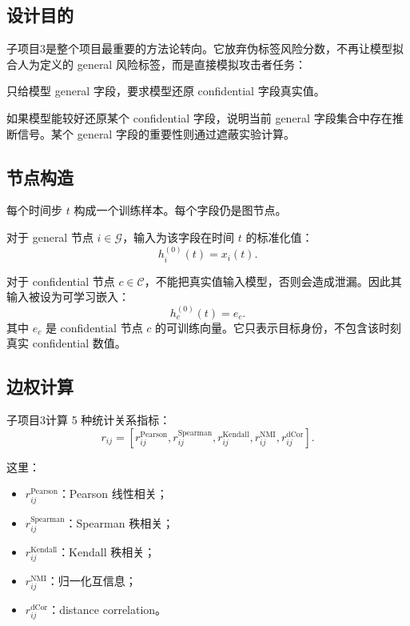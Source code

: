 \documentclass[UTF8]{ctexart}
\begin{document}
\subsection{设计目的}

子项目3是整个项目最重要的方法论转向。它放弃伪标签风险分数，不再让模型拟合人为定义的 general 风险标签，而是直接模拟攻击者任务：

\begin{center}
只给模型 general 字段，要求模型还原 confidential 字段真实值。
\end{center}

如果模型能较好还原某个 confidential 字段，说明当前 general 字段集合中存在推断信号。某个 general 字段的重要性则通过遮蔽实验计算。

\subsection{节点构造}

每个时间步 \(t\) 构成一个训练样本。每个字段仍是图节点。

对于 general 节点 \(i\in\mathcal{G}\)，输入为该字段在时间 \(t\) 的标准化值：
\[
h_i^{(0)}(t)=x_i(t).
\]

对于 confidential 节点 \(c\in\mathcal{C}\)，不能把真实值输入模型，否则会造成泄漏。因此其输入被设为可学习嵌入：
\[
h_c^{(0)}(t)=e_c.
\]
其中 \(e_c\) 是 confidential 节点 \(c\) 的可训练向量。它只表示目标身份，不包含该时刻真实 confidential 数值。

\subsection{边权计算}

子项目3计算 5 种统计关系指标：
\[
r_{ij}
=
\left[
r_{ij}^{\text{Pearson}},
r_{ij}^{\text{Spearman}},
r_{ij}^{\text{Kendall}},
r_{ij}^{\text{NMI}},
r_{ij}^{\text{dCor}}
\right].
\]

这里：
\begin{itemize}
    \item \(r_{ij}^{\text{Pearson}}\)：Pearson 线性相关；
    \item \(r_{ij}^{\text{Spearman}}\)：Spearman 秩相关；
    \item \(r_{ij}^{\text{Kendall}}\)：Kendall 秩相关；
    \item \(r_{ij}^{\text{NMI}}\)：归一化互信息；
    \item \(r_{ij}^{\text{dCor}}\)：distance correlation。
\end{itemize}
\end{document}
